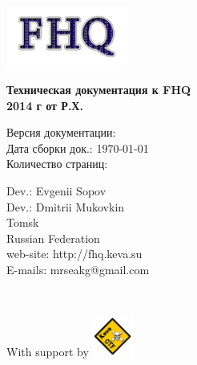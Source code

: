 \begin{titlepage}

\noindent
\begin{flushright}
\includegraphics[width=0.3\textwidth]{./img/logo}~
\\[3cm]

\end{flushright}
\begin{center}
{ \huge \bfseries Техническая документация к FHQ \\ 2014 г от Р.Х.\\[2cm] }
\end{center}

\noindent
\begin{minipage}{0.4\textwidth}
\begin{flushleft}
Версия документации:  \\
Дата сборки док.: \today \\
Количество страниц: \pageref{LastPage} \\
\end{flushleft}
\end{minipage}%

\vfill


\noindent
\begin{minipage}{0.5\textwidth}
\begin{flushleft}
Dev.: Evgenii Sopov \\
Dev.: Dmitrii Mukovkin \\
Tomsk \\
Russian Federation \\[0.4cm]
web-site: http://fhq.keva.su \\
E-mails: mrseakg@gmail.com
\end{flushleft}
\end{minipage}%
\\[1cm]

\noindent

\begin{minipage}{1.0\textwidth}
\begin{flushright}
With support by
\includegraphics[width=0.1\textwidth]{./img/keva}~
\end{flushright}
\end{minipage}%


\end{titlepage}
